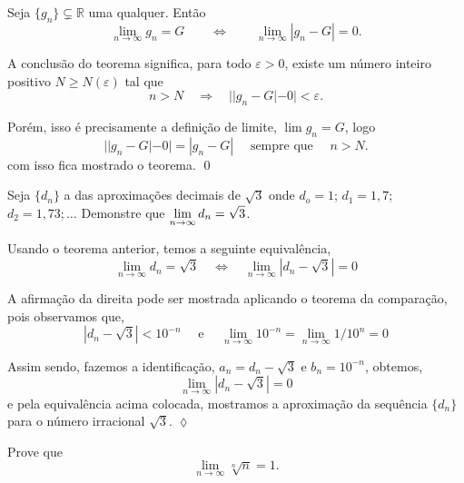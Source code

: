 \begin{fteo}
Seja $\{g_n\}\subsetneq \mathbb{R}$ uma \seq qualquer. Ent\~{a}o
\begin{equation*}
    \lim_{n\to\infty} g_n=G\qquad \Leftrightarrow\qquad
    \lim_{n\to\infty}| g_n-G|=0.
\end{equation*}
\end{fteo}

\prova A conclus\~{a}o do teorema significa, para todo $\varepsilon>0$, existe um n\'{u}mero inteiro positivo $N\geq N(\varepsilon)$ tal que
\begin{equation*}
    n>N\quad \Rightarrow\quad ||g_n-G|-0|<\varepsilon.
\end{equation*}

Por\'{e}m, isso \'{e} precisamente a defini\c{c}\~{a}o de limite, $\lim g_n=G$, logo
\begin{equation*}
||g_n-G|-0|=|g_n-G|\quad \text{ sempre que }\quad n>N.
\end{equation*}
com isso fica mostrado o teorema. \qed

\begin{exer}
Seja $\{d_n\}$ a \seq das aproxima\c{c}\~{o}es decimais de $\sqrt{3}$ onde
$d_o=1$; $d_1=1,7$; $d_2=1,73;\ldots$ Demonstre que $\displaystyle{\lim_{n\to\infty}d_n=\sqrt{3}}$.
\end{exer}

\solo Usando o teorema anterior, temos a seguinte equival\^{e}ncia,
\begin{equation*}
\lim_{n\to\infty}d_n=\sqrt{3}\quad \Leftrightarrow\quad \lim_{n\to\infty}|d_n-\sqrt{3}|=0
\end{equation*}

A afirma\c{c}\~{a}o da direita pode ser mostrada aplicando o teorema da compara\c{c}\~{a}o, pois observamos que,
\begin{equation*}
|d_n-\sqrt{3}|<10^{-n}\quad \text{ e }\quad \lim_{n\to\infty} 10^{-n}=\lim_{n\to\infty}1/ 10^{n}=0
\end{equation*}

Assim sendo, fazemos a identifica\c{c}\~{a}o, $a_n=d_n-\sqrt{3}$ e $b_n=10^{-n}$, obtemos,
\begin{equation*}
\lim_{n\to\infty}|d_n-\sqrt{3}|=0
\end{equation*}
e pela equival\^{e}ncia acima colocada, mostramos a aproxima\c{c}\~{a}o da sequ\^{e}ncia $\{d_n\}$ para o n\'{u}mero irracional $\sqrt{3}$. \hfill \(\lozenge\)

\begin{exer}
Prove que
\begin{equation*}
    \lim_{n\to \infty}\sqrt[n]{n}=1.
\end{equation*}
\end{exer}

